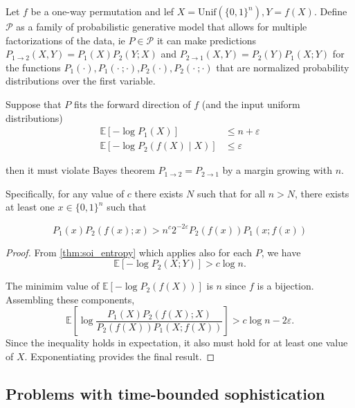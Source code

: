 \documentclass[twoside]{article}
\newcommand{\E}{\mathbb{E}}
\begin{document}
\begin{corollary}
\label{cor:inf_fac2}
     Let $f$ be a one-way permutation and lef $X = \mathrm{Unif}(\{0, 1\}^n), Y=f(X)$. Define $\mathcal{P}$ as a family of probabilistic generative model that allows for multiple factorizations of the data, ie $P\in \mathcal P$ it can make predictions $P_{1\to 2}(X,Y)=P_1(X)P_2(Y;X)$ and $P_{2\to 1}(X,Y)=P_2(Y)P_1(X;Y)$ for the functions $P_1(\cdot),P_1(\cdot \ ;\cdot)$,$P_2(\cdot),P_2(\cdot \ ;\cdot)$ that are normalized probability distributions over the first variable. 

     Suppose that $P$ fits the forward direction of $f$ (and the input uniform distributions)
     \begin{align*}
         \E[-\log P_1(X)] &\le n+\varepsilon\\
         \E[-\log P_2(f(X)\mid X)] &\le \varepsilon
     \end{align*}

    then it must violate Bayes theorem $P_{1\to 2} = P_{2\to 1}$ by a margin growing with $n$.
     
     Specifically, for any value of $c$ there exists $N$ such that for all $n > N$, there exists at least one $x \in \{0,1\}^n$ such that
     
    \begin{equation}
         P_1(x)P_2(f(x);x)> n^c 2^{-2\varepsilon} P_2(f(x))P_1(x;f(x))
    \end{equation}
\end{corollary}
\begin{proof}
From \autoref{thm:soi_entropy} which applies also for each $P$, we have
\begin{equation*}
     \E\left[-\log P_2(X ; Y)\right] > c \log n .
\end{equation*}
       
The minimim value of $\E\left[-\log P_2(f(X))\right]$ is $n$ since $f$ is a bijection. Assembling these components,
\begin{equation}
   \E\left[\log \frac{P_1(X)P_2(f(X);X)}{P_2(f(X)) P_1(X ; f(X))}\right] >c \log n - 2\varepsilon.
\end{equation}
Since the inequality holds in expectation, it also must hold for at least one value of $X$. Exponentiating provides the final result.
\end{proof}

%
%

%
%

%

\subsection{Problems with time-bounded sophistication}
\label{app:time_bounded_sophistication}
\end{document}
